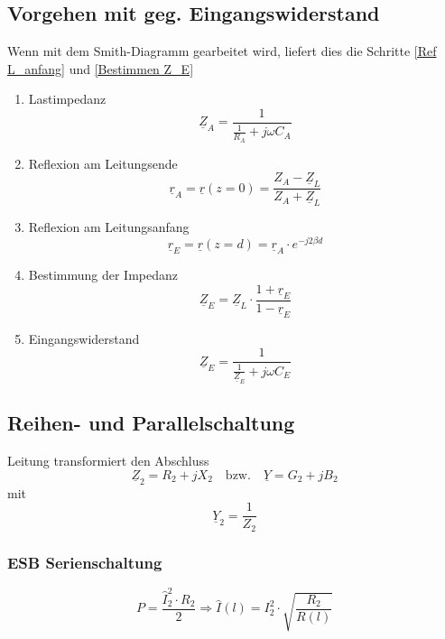 \subsection{Vorgehen mit geg. Eingangswiderstand}
Wenn mit dem Smith-Diagramm gearbeitet
wird, liefert dies die Schritte \ref{Ref L_anfang} und \ref{Bestimmen Z_E}
\begin{enumerate}
	\item Lastimpedanz
	\[ \underline{Z}_A = \dfrac{1}{\frac{1}{R_A} + j \omega C_A} \]
	\item Reflexion am Leitungsende
	\[ \underline{r}_A = \underline{r}(z=0) = \dfrac{Z_A - \underline{Z}_L}{Z_A + \underline{Z}_L} \]
	\item Reflexion am Leitungsanfang \label{Ref L_anfang}
	\[ \underline{r}_E = \underline{r}(z=d) =  \underline{r}_A \cdot e^{-j 2 \beta d}\]
	\item Bestimmung der Impedanz \label{Bestimmen Z_E}
	\[ \underline{Z}_E = \underline{Z}_L \cdot \dfrac{1 + \underline{r}_E}{1 - \underline{r}_E}\]
	\item Eingangswiderstand
	\[ \underline{Z}_E = \dfrac{1}{\frac{1}{\underline{Z}_E} + j \omega C_E}\]
\end{enumerate}

\subsection{Reihen- und Parallelschaltung}
Leitung transformiert den Abschluss
\[ \underline{Z}_2 = R_2 + jX_2 \quad \text{bzw.} \quad \underline{Y}=G_2 + jB_2\]
mit \[ \underline{Y}_2=\frac{1}{Z_2}  \]

\subsubsection{ESB Serienschaltung}
\[ P = \frac{\hat{I}^2_2 \cdot R_2}{2} \Rightarrow \hat{I}(l) = I^2_2 \cdot \sqrt{\frac{R_2}{R(l)}} \]